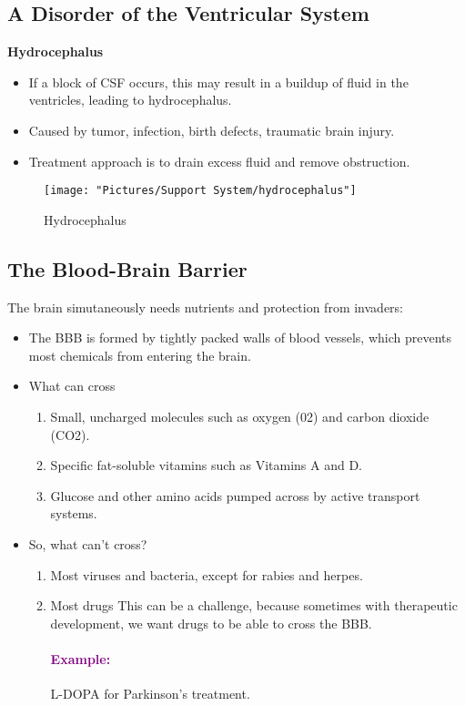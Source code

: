 \documentclass[12pt,a4paper]{article}
\newcommand{\example}[1]{\paragraph{\textcolor{purple}{Example:}} #1}
\begin{document}
	\subsection{A Disorder of the Ventricular System}
	\textbf{Hydrocephalus}
	\begin{itemize}
		\item If a block of CSF occurs, this may result in a buildup of fluid in the ventricles, leading to hydrocephalus. 
		\item Caused by tumor, infection, birth defects, traumatic brain injury. 
		\item Treatment approach is to drain excess fluid and remove obstruction. 
	\end{itemize}
	
	
\begin{figure}
	\centering
	\texttt{[image: "Pictures/Support System/hydrocephalus"]}
	\caption{Hydrocephalus}
	\label{fig:hydrocephalus}
\end{figure}
	
	\subsection{The Blood-Brain Barrier}
	
	The brain simutaneously needs nutrients and protection from invaders:
	\begin{itemize}
		\item The BBB is formed by tightly packed walls of blood vessels, which prevents most chemicals from entering the brain. 
		\item What can cross
		\begin{enumerate}
			\item Small, uncharged molecules such as oxygen (02) and carbon dioxide (CO2).
			\item Specific fat-soluble vitamins such as Vitamins A and D. 
			\item Glucose and other amino acids pumped across by active transport systems. 
		\end{enumerate} 
		\item So, what can't cross? 
		\begin{enumerate}
			\item Most viruses and bacteria, except for rabies and herpes. 
			\item Most drugs 
			\subitem This can be a challenge, because sometimes with therapeutic development, we want drugs to be able to cross the BBB. 
			\example{L-DOPA for Parkinson's treatment}.
		\end{enumerate}
	\end{itemize}
	
\end{document}
